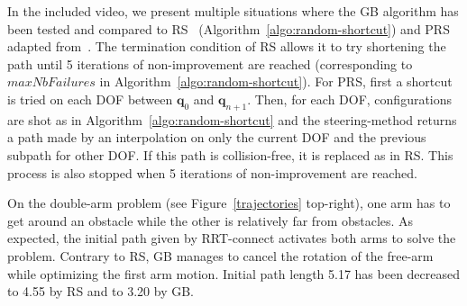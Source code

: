 \documentclass{tADR2e}
\newcommand\conf{\mathbf{q}}
\begin{document}
In the included video, we present multiple situations where the GB algorithm has 
been tested and compared to RS~\cite{randomShortcutHPP}
(Algorithm~\ref{algo:random-shortcut}) and PRS ~\cite{partialrandomShortcutHPP} 
adapted from~\cite{Geraerts04clearancebased}.
The termination condition of RS allows it to try 
shortening the path until 5 iterations of non-improvement are reached 
(corresponding to $maxNbFailures$ in Algorithm~\ref{algo:random-shortcut}).
For PRS, first a shortcut is tried on each DOF between $\conf_0$ and $\conf_{n+1}$. Then, for each DOF, configurations are shot as in Algorithm~\ref{algo:random-shortcut} and the steering-method returns a path made by an interpolation on only the current DOF and the previous subpath for other DOF. If this path is collision-free, it is replaced as in RS. This process is also stopped when 5 iterations of non-improvement are reached.


On the double-arm problem (see Figure~\ref{trajectories} top-right), one arm has to get around an obstacle while the 
other is relatively far from obstacles. As expected, the initial path given by 
RRT-connect activates both arms to solve the problem. Contrary to RS, 
GB manages to cancel the rotation of the free-arm while optimizing the 
first arm motion. Initial path length 5.17 has been decreased to 4.55 by RS and to 3.20 by GB.
\end{document}
